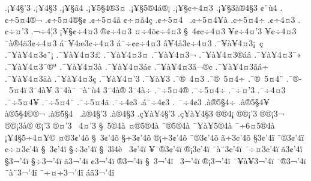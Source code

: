 {.^^a1^^a54^^a7'3
.^^a1^^a54^^a73
.^^a1^^a5^^a7^^e34
.^^a1^^a55^^a74^^ae3^^a4
.^^a1^^a5^^a75^^ae4^^e1^^ae^^a1
.^^a1^^a5^^a7^^a2^^f74^^a43
.^^a1^^a5^^a73^^e0^^ae4^^a73
^^a2^^a8^^f94
.^^a2^^f75^^a44^^ae^^ac
.^^a2^^f75^^a44^^ae^^a7^^a2
.^^a2^^f75^^a44^^e3^^ad
^^a2^^f7^^a4^^e34^^e7
.^^a2^^f75^^a44^^a0
.^^a2^^f75^^a44^^a5^^e0
.^^a2^^f75^^a44^^f7
.^^a2^^f74^^a43
.^^a2^^f7^^a4'3
.^^ac^^f74^^a63
^^a1^^a5^^a7^^a2^^f74^^a43
^^ae^^a2^^f74^^a43
^^a4^^f74^^f5^^a2^^f74^^a43
^^a7^^a04^^a2^^a2^^f74^^a43
^^ad^^a5^^a2^^f74^^a4'3
^^ad^^a5^^a2^^f74^^a43
^^af^^e0^^ae4^^e43^^a2^^f74^^a43
^^e1^^af^^a54^^e63^^a2^^f74^^a43
^^e1^^af^^f7^^a2^^a2^^f74^^a43
^^e2^^a54^^e53^^a2^^f74^^a43
.^^af^^a5^^e0^^a54^^a43^^a1^^a0^^e7
.^^af^^a5^^e0^^a54^^a43^^a2^^a8^^a1
.^^af^^a5^^e0^^a54^^a43^^a3
.^^af^^a5^^e0^^a54^^a43^^a4
.^^af^^a5^^e0^^a54^^a43^^ac
.^^af^^a5^^e0^^a54^^a43^^ae^^e1^^e2
.^^af^^a5^^e0^^a54^^a43^^af^^ab^^a0
.^^af^^a5^^e0^^a54^^a43^^af^^ae^^aa
.^^af^^a5^^e0^^a54^^a43^^e0
.^^af^^a5^^e0^^a54^^a43^^e1^^a2
.^^af^^a5^^e0^^a54^^a43^^e3^^ac^^ae^^a2
.^^af^^a5^^e0^^a54^^a43^^e3^^e1^^f7
.^^af^^a5^^e0^^a54^^a43^^e4^^e0
.^^af^^a5^^e0^^a54^^a43^^e7
.^^af^^a5^^e0^^a54^^a4'3
.^^af^^a5^^e0^^a53
.^^af^^ae^^ad^^a04^^a43
.^^af^^ae^^ad^^a05^^a44^^f7
.^^af^^ae^^ad^^a05^^a44^^a8
.^^af^^ae^^ad^^a05^^a44^^ef
3^^af4^^e0^^a5
3^^af4^^e0^^a8
^^af^^e0^^a8^^f94
3^^af4^^e0^^ae
3^^af4^^e0^^f7
.^^af^^f75^^a44^^ae
.^^af^^f75^^a44^^f7
.^^af^^f7^^a4'3
.^^af^^f74^^a43
.^^af^^f75^^a44^^a5
.^^af^^f75^^a44^^a8
.^^af^^f75^^a44^^e3
.^^af^^f74^^a23
.^^e1^^af^^f74^^a23
.^^ad^^a0^^af^^f74^^a23
.^^e0^^ae5^^a74^^f7
.^^e0^^ae5^^a74^^a5
^^e0^^ae5^^a74^^a9^^ae^^ac
.^^e0^^ae5^^a74^^a0
.^^e0^^ae4^^a7'3
.^^e0^^ae4^^a73
.^^e7^^a5^^e0^^a54^^a7'3
.^^e7^^a5^^e0^^a54^^a73
^^ae^^ae4^^a1
^^ae^^ae^^a1'3
^^ae^^ae^^a13^^ac
^^ae^^ae^^a13^^e0^^ae
^^ae^^a1'3
^^ae^^a4'3
^^ad^^a04^^a4'3
^^a7^^a05^^ae4^^e0
^^a4^^ae5^^ae4^^e0
^^af^^ae5^^ae4^^e0
^^af^^a5^^e0^^a55^^ae4^^e0
^^af^^f76^^a45^^ae4^^e0
^^a1^^a54^^a75^^f74^^a4^^a5^^a9
^^a4^^ae3^^a2'4^^f5
^^a7^^a03^^a2'4^^f5
^^a7^^f73^^a2'4^^f5
^^ae^^a1^^f73^^a2'4^^f5
^^af^^ae3^^a2'4^^f5
^^e3^^f73^^a2'4^^f5
^^a73^^a2'4^^ef
^^af^^ae3^^a2'4^^ef
^^a2^^f7^^a43^^a2'4^^ef
^^a7^^a03^^a2'4^^ef
^^a7^^f73^^a2'4^^ef
^^a7^^a03^^ee4^^e8
^^ad^^a03^^a2'4^^ef
^^ad^^a5^^af^^ae3^^a2'4^^ef
^^ae^^a13^^a2'4^^ef
^^af^^e0^^a83^^a2'4^^ef
^^af^^f7^^a43^^a2'4^^ef
^^e33^^a2'4^^ef
^^a73^^ac'4^^ef
^^a7^^f73^^ac'4^^ef
^^e33^^ac'4^^ef
^^a23^^ac'4^^ef
^^ad^^ae3^^ac'4^^ef
^^a7^^a03^^ac'4^^ef
^^ad^^a03^^ac'4^^ef
^^ae^^a13^^ac'4^^ef
^^af^^a5^^e0^^a53^^ac'4^^ef
^^af^^ae3^^ac'4^^ef
^^af^^e0^^a83^^ac'4^^ef
^^af^^f7^^a4^^f73^^ac'4^^ef
^^e1^^e33^^ac'4^^ef
}
